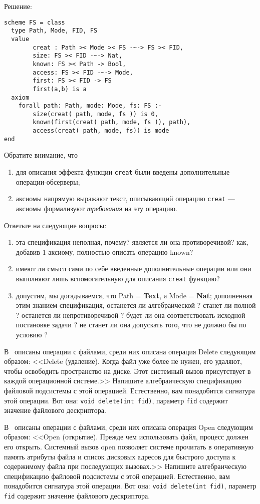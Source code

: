 Решение:
\begin{lstlisting}
scheme FS = class
  type Path, Mode, FID, FS
  value
        creat : Path >< Mode >< FS -~-> FS >< FID,
        size: FS >< FID -~-> Nat,
        known: FS >< Path -> Bool,
        access: FS >< FID -~-> Mode,
        first: FS >< FID -> FS
        first(a,b) is a
  axiom
    forall path: Path, mode: Mode, fs: FS :-
        size(creat( path, mode, fs )) is 0,
        known(first(creat( path, mode, fs )), path),
        access(creat( path, mode, fs)) is mode
end
\end{lstlisting}
Обратите внимание, что
\begin{enumerate}
  \item для описания эффекта функции \texttt{creat} были введены дополнительные операции-обсерверы;
  \item аксиомы напрямую выражают текст, описывающий операцию \texttt{creat} --- аксиомы формализуют \emph{требования} на эту операцию.
\end{enumerate}
Ответьте на следующие вопросы:
\begin{enumerate}
  \item эта спецификация неполная, почему? является ли она противоречивой? как, добавив 1 аксиому, полностью описать операцию known?
  \item имеют ли смысл сами по себе введенные дополнительные операции или они выполняют лишь вспомогательную для описания \texttt{creat} функцию?
  \item допустим, мы догадываемся, что Path = \textbf{Text}, а Mode = \textbf{Nat}; дополненная этим знанием спецификация, останется ли алгебраической ? станет ли полной ? останется ли непротиворечивой ? будет ли она соответствовать исходной постановке задачи ? не станет ли она допускать того, что не должно бы по условию ?
\end{enumerate}

\z В~\cite{tanenbaum_os} описаны операции с файлами, среди них описана операция Delete следующим образом: <<\textsf{Delete} (удаление). Когда файл уже более не нужен, его удаляют, чтобы освободить пространство на диске. Этот системный вызов присутствует в каждой операционной системе.>> Напишите алгебраическую спецификацию файловой подсистемы с этой операцией. Естественно, вам понадобится сигнатура этой операции. Вот она:  \texttt{void delete(int fid)}, параметр \texttt{fid} содержит значение файлового дескриптора.

\z В~\cite{tanenbaum_os} описаны операции с файлами, среди них описана операция Open следующим образом: <<\textsf{Open} (открытие). Прежде чем использовать файл, процесс должен его открыть. Системный вызов open позволяет системе прочитать в оперативную память атрибуты файла и список дисковых адресов для быстрого доступа к содержимому файла при последующих вызовах.>> Напишите алгебраическую спецификацию файловой подсистемы с этой операцией. Естественно, вам понадобится сигнатура этой операции. Вот она:  \texttt{void delete(int fid)}, параметр \texttt{fid} содержит значение файлового дескриптора.

